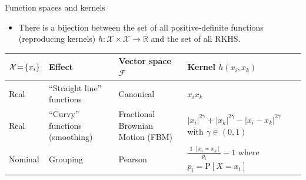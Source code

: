 \documentclass[]{beamer}\usepackage[]{graphicx}\usepackage[]{color}
\DeclareMathOperator{\indicator}{\mathds{1}}
\begin{document}
\begin{frame}{Function spaces and kernels}
	\begin{itemize}
		\item There is a bijection between the set of all positive-definite functions (reproducing kernels) $h:\mathcal X \times \mathcal X \rightarrow \mathbb R$ and the set of all RKHS.
	\end{itemize}

	\small{
	\renewcommand{\arraystretch}{1.3}
	\begin{table}[htdp]
	\begin{center}
	\begin{tabular}{m{1.15cm}|m{2.5cm}|m{2.7cm}|m{3.3cm}}
	$\tiny{\mathcal X \!=\! \{x_i\}}$	&\textbf{Effect}		&\textbf{Vector space} $\mathcal{F}$		&\textbf{Kernel} $h( x_i,  x_k)$ \\
	\hline
	Real		&\footnotesize{``Straight line'' \newline functions}
	&Canonical	&$x_ix_k$ \\
	\hline
	Real		&\footnotesize{``Curvy'' functions \newline (smoothing)}
	&Fractional Brownian Motion (FBM)	&\footnotesize{$|x_i|^{2\gamma} + |x_k|^{2\gamma} - |x_i - x_k|^{2\gamma}$ with $\gamma \in (0,1)$} \\
	\hline
	Nominal		&\footnotesize{Grouping}
	&Pearson	&$\frac{\indicator[x_i=x_k]}{p_i} - 1$ \newline \footnotesize{where $p_i = \text{P}[X = x_i]$} \\
	\end{tabular}
	\end{center}
	\label{default}
	\end{table}
	}

\end{frame}
\end{document}
